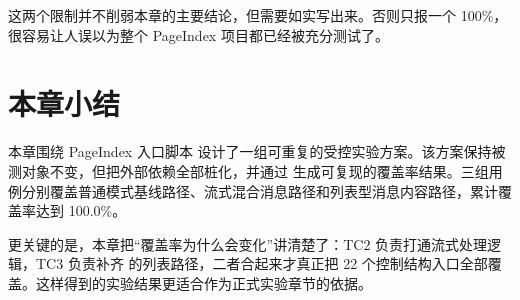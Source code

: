 这两个限制并不削弱本章的主要结论，但需要如实写出来。否则只报一个 100\%，很容易让人误以为整个 PageIndex 项目都已经被充分测试了。

\section{本章小结}

本章围绕 PageIndex 入口脚本  设计了一组可重复的受控实验方案。该方案保持被测对象不变，但把外部依赖全部桩化，并通过  生成可复现的覆盖率结果。三组用例分别覆盖普通模式基线路径、流式混合消息路径和列表型消息内容路径，累计覆盖率达到 100.0\%。

更关键的是，本章把“覆盖率为什么会变化”讲清楚了：TC2 负责打通流式处理逻辑，TC3 负责补齐  的列表路径，二者合起来才真正把 22 个控制结构入口全部覆盖。这样得到的实验结果更适合作为正式实验章节的依据。
